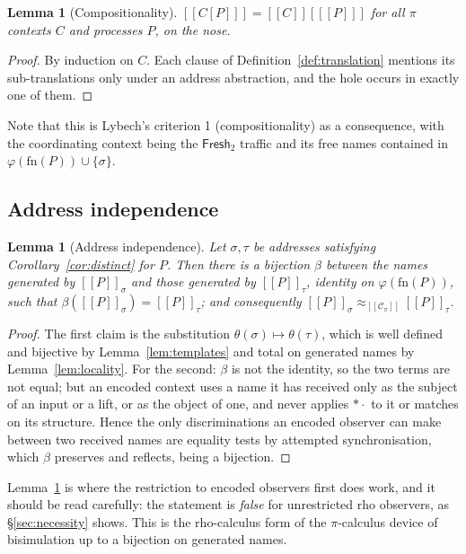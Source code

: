 \documentclass[11pt]{article}
\theoremstyle{definition}
\theoremstyle{plain}
\newtheorem{lemma}[definition]{Lemma}
\theoremstyle{remark}
\newcommand{\drp}[1]{{*}#1}
\newcommand{\enc}[1]{[\![#1]\!]}
\newcommand{\Frsh}{\mathsf{Fresh}_2}
\newcommand{\Ctx}{\mathscr{C}}
\newcommand{\bisim}{\approx}
\newcommand{\fn}{\mathrm{fn}}
\begin{document}
\begin{lemma}[Compositionality]\label{lem:compositional}
$\enc{C[P]} = \enc{C}[\enc{P}]$ for all $\pi$ contexts $C$ and processes
$P$, on the nose.
\end{lemma}

\begin{proof}
By induction on $C$. Each clause of Definition~\ref{def:translation}
mentions its sub-translations only under an address abstraction, and the
hole occurs in exactly one of them.
\end{proof}

Note that this is Lybech's criterion 1 (compositionality) as a
consequence, with the coordinating context being the $\Frsh$ traffic and
its free names contained in $\varphi(\fn(P)) \cup \{\sigma\}$.

\subsection{Address independence}

\begin{lemma}[Address independence]\label{lem:addrind}
Let $\sigma, \tau$ be addresses satisfying
Corollary~\ref{cor:distinct} for $P$. Then there is a bijection $\beta$
between the names generated by $\enc{P}_\sigma$ and those generated by
$\enc{P}_\tau$, identity on $\varphi(\fn(P))$, such that
$\beta(\enc{P}_\sigma) = \enc{P}_\tau$; and consequently
$\enc{P}_\sigma \bisim_{\enc{\Ctx_\pi}} \enc{P}_\tau$.
\end{lemma}

\begin{proof}
The first claim is the substitution $\theta(\sigma) \mapsto \theta(\tau)$,
which is well defined and bijective by Lemma~\ref{lem:templates} and
total on generated names by Lemma~\ref{lem:locality}. For the second:
$\beta$ is not the identity, so the two terms are not equal; but an
encoded context uses a name it has received only as the subject of an
input or a lift, or as the object of one, and never applies $\drp{\cdot}$
to it or matches on its structure. Hence the only discriminations an
encoded observer can make between two received names are equality tests
by attempted synchronisation, which $\beta$ preserves and reflects, being
a bijection.
\end{proof}

Lemma~\ref{lem:addrind} is where the restriction to encoded observers
first does work, and it should be read carefully: the statement is
\emph{false} for unrestricted rho observers, as \S\ref{sec:necessity}
shows. This is the rho-calculus form of the $\pi$-calculus device of
bisimulation up to a bijection on generated names.
\end{document}
